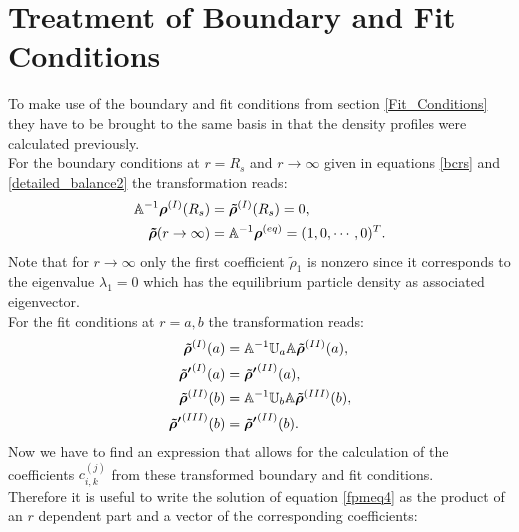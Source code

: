\section{Treatment of Boundary and Fit Conditions}
\label{Treatment_of_Boundary_and_Fit_Conditions}
To make use of the boundary and fit conditions from section \ref{Fit_Conditions} they have to be brought to the same basis in that the density profiles were calculated previously. \\
For the boundary conditions at $r=R_s$ and $r \rightarrow \infty$ given in equations \eqref{bcrs} and \eqref{detailed_balance2} the transformation reads:
\begin{align}
    \mathbb{A}^{-1}\boldsymbol{\mathbf{\rho}}^{(I)}(R_s) &= \boldsymbol{\mathbf{\tilde{\rho}}}^{(I)}(R_s) = 0, \nonumber \\
    \boldsymbol{\mathbf{\tilde{\rho}}}(r \rightarrow \infty) &= \mathbb{A}^{-1} \boldsymbol{\mathbf{\rho}}^{(eq)} = (1,0,\cdots,0)^{T}.
\end{align}
Note that for $r\rightarrow \infty$ only the first coefficient $\tilde{\rho}_1$ is nonzero since it corresponds to the eigenvalue $\lambda_1=0$ which has the equilibrium particle density as associated eigenvector.\\
For the fit conditions at $r=a,b$ the transformation reads:
\begin{align}
    \boldsymbol{\mathbf{\tilde{\rho}}}^{(I)}(a) &= \mathbb{A}^{-1}\mathbb{U}_a\mathbb{A} \boldsymbol{\mathbf{\tilde{\rho}}}^{(II)}(a), \\ \nonumber
    \boldsymbol{\mathbf{\tilde{\rho} '}}^{(I)}(a) &= \boldsymbol{\mathbf{\tilde{\rho} '}}^{(II)}(a), \\ \nonumber
    \boldsymbol{\mathbf{\tilde{\rho}}}^{(II)}(b) &= \mathbb{A}^{-1}\mathbb{U}_b\mathbb{A} \boldsymbol{\mathbf{\tilde{\rho}}}^{(III)}(b), \\ \nonumber
    \boldsymbol{\mathbf{\tilde{\rho} '}}^{(III)}(b) &= \boldsymbol{\mathbf{\tilde{\rho} '}}^{(II)}(b).
\end{align}
Now we have to find an expression that allows for the calculation of the coefficients $c_{i,k}^{(j)}$ from these transformed boundary and fit conditions.\\
Therefore it is useful to write the solution of equation \eqref{fpmeq4} as the product of an $r$ dependent part and a vector of the corresponding coefficients:
